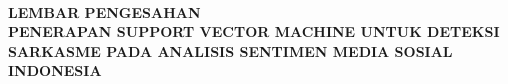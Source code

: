 \renewcommand{\headrulewidth}{3pt} 
\thispagestyle{fancy}

\hspace{-2cm}\\[1cm]
\begin{center}
{\bfseries LEMBAR PENGESAHAN}\\[1.0 cm]
{\bfseries PENERAPAN SUPPORT VECTOR MACHINE UNTUK DETEKSI SARKASME PADA ANALISIS SENTIMEN MEDIA SOSIAL INDONESIA} \\[0.5 cm]
\end{center}

\vspace{0.5cm}


